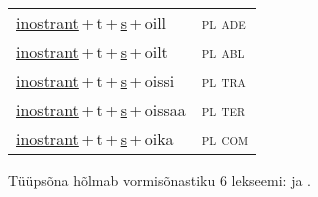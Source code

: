 \begin{minipage}{\textwidth}
\begin{sideways}
\begin{tabular}{l l}
\underline{inostrant}\,+\,t\,+\,\underline{s}\,+\,oill & \textsc{ pl ade } \\
\underline{inostrant}\,+\,t\,+\,\underline{s}\,+\,oilt & \textsc{ pl abl } \\
\underline{inostrant}\,+\,t\,+\,\underline{s}\,+\,oissi & \textsc{ pl tra } \\
\underline{inostrant}\,+\,t\,+\,\underline{s}\,+\,oissaa & \textsc{ pl ter } \\
\underline{inostrant}\,+\,t\,+\,\underline{s}\,+\,oika & \textsc{ pl com } \\
\end{tabular}
\end{sideways}
\label{tab:tüüpsõnamall-inostranttsõ}

\end{minipage}

 
\vspace{1em}
\noindent Tüüpsõna hõlmab vormisõnastiku 6 lekseemi:  ja .
